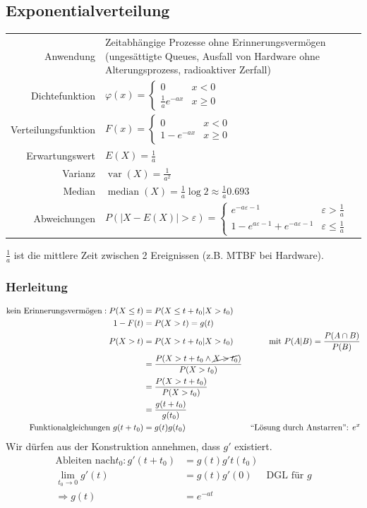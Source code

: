 \documentclass[10pt,a4paper]{scrartcl}
\newif\ifincludeDerivations
\DeclareMathOperator{\var}{var}
\DeclareMathOperator{\median}{median}
\begin{document}
\subsection{Exponentialverteilung}
\begin{tabular}{r p{\katalogSpaltezwei}}
Anwendung & Zeitabhängige Prozesse ohne Erinnerungsvermögen (ungesättigte Queues, 
            Ausfall von Hardware ohne Alterungsprozess, radioaktiver Zerfall) \\
Dichtefunktion & $\varphi(x) = \begin{cases} 0 & x < 0 \\ \frac{1}{a}e^{-ax} & x \ge 0 \end{cases} $ \\
Verteilungsfunktion & $F(x) = \begin{cases} 0 & x<0 \\ 1 - e^{-ax} & x \ge 0 \end{cases} $ \\
Erwartungswert & $E(X) = \frac{1}{a} $ \\
Varianz & $\var(X) = \frac{1}{a^2} $ \\
Median & $ \median(X) = \frac{1}{a} \log 2 \approx \frac{1}{a} 0.693 $ \\
Abweichungen & $P(|X - E(X)| > \varepsilon) = \begin{cases} e^{-a\varepsilon-1} & \varepsilon > \frac{1}{a} \\ 1 - e^{a\varepsilon-1} + e^{-a\varepsilon-1} & \varepsilon \le \frac{1}{a}\end{cases}$ 
\end{tabular} 

$\frac{1}{a}$ ist die mittlere Zeit zwischen 2 Ereignissen (z.B. MTBF bei Hardware).

\ifincludeDerivations
\subsubsection{Herleitung}
\begin{align*}
\text{kein Erinnerungsvermögen}: P(X\le t) & = P(X \le t + t_0 | X > t_0) \\ 
1 - F(t) & = P(X>t) = g(t) \\
P(X>t) & = P(X > t+t_0 | X > t_0) & \text{mit } P(A|B) = \frac{P(A\cap B)}{P(B)}\\ 
 & =  \frac{P(X > t+t_0 \wedge \cancel{X > t_0})}{P(X>t_0)} \\ 
 & = \frac{P(X > t+t_0)}{P(X>t_0)} \\
 & = \frac{g(t+t_0)}{g(t_0)} \\
 \text{Funktionalgleichungen } g(t+t_0) & = g(t)g(t_0) & \text{``Lösung durch Anstarren'': } e^x\\
\end{align*}
Wir dürfen aus der Konstruktion annehmen, dass $g'$ existiert.
\begin{align*}
\text{Ableiten nach} t_0: g'(t+t_0) & = g(t)g't(t_0) \\
\lim_{t_0 \to 0} g'(t) & = g(t)g'(0) & \text{DGL für } g \\
\Rightarrow g(t) & = e^{-at} 
\end{align*}
\end{document}
